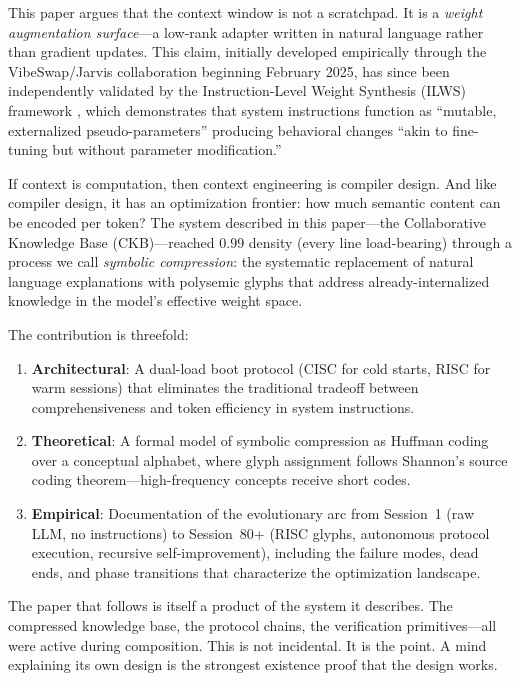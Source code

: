 \documentclass[11pt, a4paper]{article}
\begin{document}
This paper argues that the context window is not a scratchpad. It is a \emph{weight augmentation surface}---a low-rank adapter written in natural language rather than gradient updates. This claim, initially developed empirically through the VibeSwap/Jarvis collaboration beginning February 2025, has since been independently validated by the Instruction-Level Weight Synthesis (ILWS) framework \citep{ilws2025}, which demonstrates that system instructions function as ``mutable, externalized pseudo-parameters'' producing behavioral changes ``akin to fine-tuning but without parameter modification.''

If context is computation, then context engineering is compiler design. And like compiler design, it has an optimization frontier: how much semantic content can be encoded per token? The system described in this paper---the Collaborative Knowledge Base (CKB)---reached 0.99 density (every line load-bearing) through a process we call \emph{symbolic compression}: the systematic replacement of natural language explanations with polysemic glyphs that address already-internalized knowledge in the model's effective weight space.

The contribution is threefold:

\begin{enumerate}[leftmargin=*]
    \item \textbf{Architectural}: A dual-load boot protocol (CISC for cold starts, RISC for warm sessions) that eliminates the traditional tradeoff between comprehensiveness and token efficiency in system instructions.
    \item \textbf{Theoretical}: A formal model of symbolic compression as Huffman coding over a conceptual alphabet, where glyph assignment follows Shannon's source coding theorem---high-frequency concepts receive short codes.
    \item \textbf{Empirical}: Documentation of the evolutionary arc from Session~1 (raw LLM, no instructions) to Session~80+ (RISC glyphs, autonomous protocol execution, recursive self-improvement), including the failure modes, dead ends, and phase transitions that characterize the optimization landscape.
\end{enumerate}

The paper that follows is itself a product of the system it describes. The compressed knowledge base, the protocol chains, the verification primitives---all were active during composition. This is not incidental. It is the point. A mind explaining its own design is the strongest existence proof that the design works.
\end{document}
